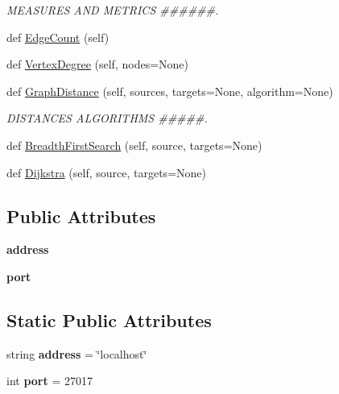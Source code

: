 \begin{DoxyCompactItemize}
\begin{DoxyCompactList}\small\item\em M\+E\+A\+S\+U\+R\+ES A\+ND M\+E\+T\+R\+I\+CS \#\#\#\#\#\#. \end{DoxyCompactList}\item 
def \hyperlink{classgraphmongo_1_1GraphMongo_a9c655ca4e219d5578b20f2e232212f1b}{Edge\+Count} (self)
\item 
def \hyperlink{classgraphmongo_1_1GraphMongo_a81f03a7b13d6f27cb959efcd9e16e7eb}{Vertex\+Degree} (self, nodes=None)
\item 
def \hyperlink{classgraphmongo_1_1GraphMongo_a05898a487478cb7409a2a510e5c716eb}{Graph\+Distance} (self, sources, targets=None, algorithm=None)
\begin{DoxyCompactList}\small\item\em D\+I\+S\+T\+A\+N\+C\+ES A\+L\+G\+O\+R\+I\+T\+H\+MS \#\#\#\#\#. \end{DoxyCompactList}\item 
def \hyperlink{classgraphmongo_1_1GraphMongo_a83f03c06d846ba61ba414a501825cdba}{Breadth\+First\+Search} (self, source, targets=None)
\item 
def \hyperlink{classgraphmongo_1_1GraphMongo_ad12c35ce9e8081ae46d42a7d19a8c8f8}{Dijkstra} (self, source, targets=None)
\end{DoxyCompactItemize}
\subsection*{Public Attributes}
\begin{DoxyCompactItemize}
\item 
\hypertarget{classgraphmongo_1_1GraphMongo_ab7afa11fffe20b5644ea8864fae5a37f}{}\label{classgraphmongo_1_1GraphMongo_ab7afa11fffe20b5644ea8864fae5a37f} 
{\bfseries address}
\item 
\hypertarget{classgraphmongo_1_1GraphMongo_aeab6f8f3e663cd0b7914c701be39821d}{}\label{classgraphmongo_1_1GraphMongo_aeab6f8f3e663cd0b7914c701be39821d} 
{\bfseries port}
\end{DoxyCompactItemize}
\subsection*{Static Public Attributes}
\begin{DoxyCompactItemize}
\item 
\hypertarget{classgraphmongo_1_1GraphMongo_a3465b2ec004b4beeafd681500e284bbe}{}\label{classgraphmongo_1_1GraphMongo_a3465b2ec004b4beeafd681500e284bbe} 
string {\bfseries address} = \char`\"{}localhost\char`\"{}
\item 
\hypertarget{classgraphmongo_1_1GraphMongo_a969049a5659c1599596cc6f5f7c2a94c}{}\label{classgraphmongo_1_1GraphMongo_a969049a5659c1599596cc6f5f7c2a94c} 
int {\bfseries port} = 27017
\end{DoxyCompactItemize}


